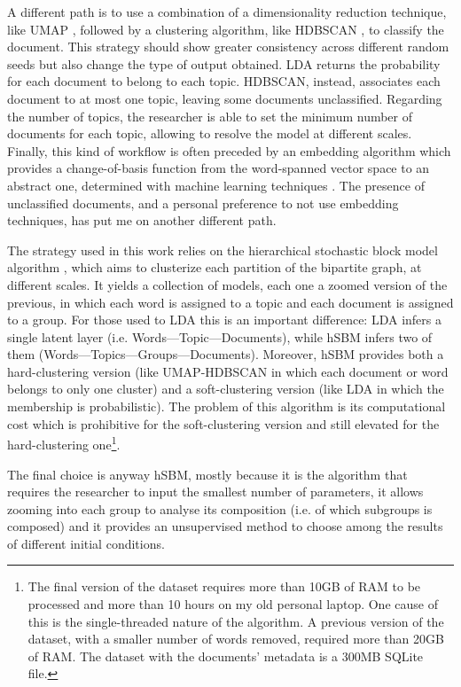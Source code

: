 \documentclass[a4paper, 11pt, headings=standardclasses, tablecaptionsbelow]{scrartcl}
\begin{document}
A different path is to use a combination of a dimensionality reduction technique, like UMAP \parencite{mcinnes2020}, followed by a clustering algorithm, like HDBSCAN \parencite{campello2013,mcinnes2017}, to classify the document. This strategy should show greater consistency across different random seeds but also change the type of output obtained. LDA returns the probability for each document to belong to each topic. HDBSCAN, instead, associates each document to at most one topic, leaving some documents unclassified. Regarding the number of topics, the researcher is able to set the minimum number of documents for each topic, allowing to resolve the model at different scales. Finally, this kind of workflow is often preceded by an embedding algorithm which provides a change-of-basis function from the word-spanned vector space to an abstract one, determined with machine learning techniques \parencite{angelov2020,grootendorst2022}.
The presence of unclassified documents, and a personal preference to not use embedding techniques, has put me on another different path.

The strategy used in this work relies on the hierarchical stochastic block model algorithm \parencite[hSBM,][]{peixoto2019,gerlach2018}, which aims to clusterize each partition of the bipartite graph, at different scales. It yields a collection of models, each one a zoomed version of the previous, in which each word is assigned to a topic and each document is assigned to a group. For those used to LDA this is an important difference: LDA infers a single latent layer (i.e. Words---Topic---Documents), while hSBM infers two of them (Words---Topics---Groups---Documents). Moreover, hSBM provides both a hard-clustering version (like UMAP-HDBSCAN in which each document or word belongs to only one cluster) and a soft-clustering version (like LDA in which the membership is probabilistic). The problem of this algorithm is its computational cost which is prohibitive for the soft-clustering version and still elevated for the hard-clustering one\footnote{The final version of the dataset requires more than 10GB of RAM to be processed and more than 10 hours on my old personal laptop. One cause of this is the single-threaded nature of the algorithm. A previous version of the dataset, with a smaller number of words removed, required more than 20GB of RAM. The dataset with the documents' metadata is a 300MB SQLite file.}.

The final choice is anyway hSBM, mostly because it is the algorithm that requires the researcher to input the smallest number of parameters, it allows zooming into each group to analyse its composition (i.e. of which subgroups is composed) and it provides an unsupervised method to choose among the results of different initial conditions.
\end{document}
